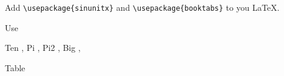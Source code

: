 \documentclass[preview]{standalone}
\begin{document}
Add  \verb+\usepackage{sinunitx}+  and \verb+\usepackage{booktabs}+  to you \LaTeX{}.

Use \verb++

Ten ,
Pi ,
Pi2 ,
Big $$,

Table


\end{document}

